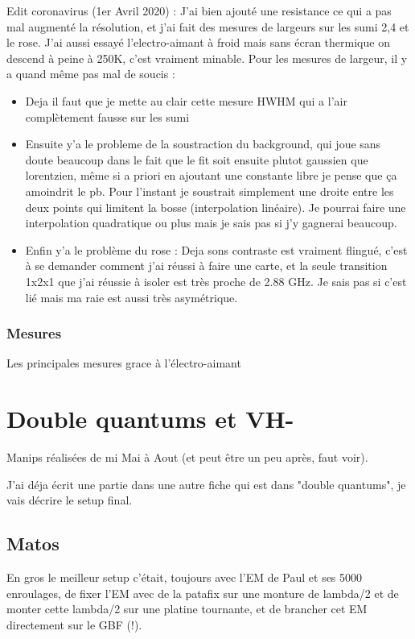 \documentclass[a4paper]{report}
\begin{document}
  Edit coronavirus (1er Avril 2020) : J'ai bien ajouté une resistance ce qui a pas mal augmenté la résolution, et j'ai fait des mesures de largeurs sur les sumi 2,4 et le rose. J'ai aussi essayé l'electro-aimant à froid mais sans écran thermique on descend à peine à 250K, c'est vraiment minable. Pour les mesures de largeur, il y a quand même pas mal de soucis :
  \begin{itemize}
  \item Deja il faut que je mette au clair cette mesure HWHM qui a l'air complètement fausse sur les sumi
  \item Ensuite y'a le probleme de la soustraction du background, qui joue sans doute beaucoup dans le fait que le fit soit ensuite plutot gaussien que lorentzien, même si a priori en ajoutant une constante libre je pense que ça amoindrit le pb. Pour l'instant je soustrait simplement une droite entre les deux points qui limitent la bosse (interpolation linéaire). Je pourrai faire une interpolation quadratique ou plus mais je sais pas si j'y gagnerai beaucoup.
  \item Enfin y'a le problème du rose : Deja sons contraste est vraiment flingué, c'est à se demander comment j'ai réussi à faire une carte, et la seule transition 1x2x1 que j'ai réussie à isoler est très proche de 2.88 GHz. Je sais pas si c'est lié mais ma raie est aussi très asymétrique.
  \end{itemize}
  \subsubsection{Mesures}
  Les principales mesures grace à l'électro-aimant
  
  \section{Double quantums et VH-}
  Manips réalisées de mi Mai à Aout (et peut être un peu après, faut voir).
  
  J'ai déja écrit une partie dans une autre fiche qui est dans "double quantums", je vais décrire le setup final.
  \subsection{Matos}
  
  En gros le meilleur setup c'était, toujours avec l'EM de Paul et ses 5000 enroulages, de fixer l'EM avec de la patafix sur une monture de lambda/2 et de monter cette lambda/2 sur une platine tournante, et de brancher cet EM directement sur le GBF (!).
  
\end{document}
